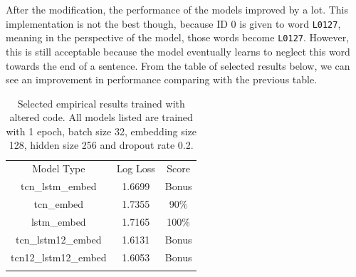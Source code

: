 \documentclass[12pt]{article}
\begin{document}
After the modification, the performance of the models improved by a lot. This implementation is not the best though, because ID \(0\) is given to word \texttt{L0127}, meaning in the perspective of the model, those words become \texttt{L0127}. However, this is still acceptable because the model eventually learns to neglect this word towards the end of a sentence. From the table of selected results below, we can see an improvement in performance comparing with the previous table.
\begin{longtable}[c]{@{}>{\ttfamily}ccc@{}}
	\toprule
	\textrm{Model Type}  & Log Loss & Score \\*
	\midrule
	\endfirsthead
	\endhead
	\bottomrule
	\endfoot
	\endlastfoot
	tcn\_lstm\_embed     & 1.6699   & Bonus \\\midrule
	tcn\_embed           & 1.7355   & 90\%  \\\midrule
	lstm\_embed          & 1.7165   & 100\% \\\midrule
	tcn\_lstm12\_embed   & 1.6131   & Bonus \\\midrule
	tcn12\_lstm12\_embed & 1.6053   & Bonus \\*\bottomrule
	\caption{Selected empirical results trained with altered code. All models listed are trained with 1 epoch, batch size 32, embedding size 128, hidden size 256 and dropout rate 0.2.}
	\label{tb:p2-1epoch-results}
\end{longtable}
\end{document}
